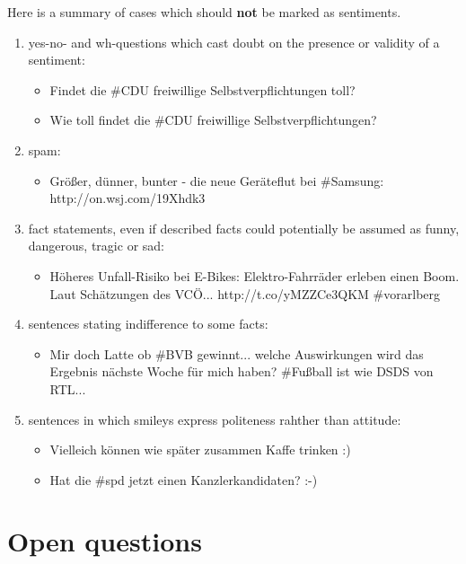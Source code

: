 \documentclass[11pt,a4paper]{article}
\begin{document}
Here is a summary of cases which should \textbf{not} be marked as
sentiments.
\begin{enumerate}
\item \label{no-sent:question} yes-no- and wh-questions which cast doubt on the presence or validity of a sentiment:
  \begin{itemize}
  \item Findet die \#{}CDU freiwillige Selbstverpflichtungen toll?
  \item Wie toll findet die \#{}CDU freiwillige Selbstverpflichtungen?
  \end{itemize}

\item spam:
  \begin{itemize}
  \item Gr\"o\ss{}er, d\"unner, bunter - die neue Ger\"ateflut bei
    \#Samsung: http://on.wsj.com/19Xhdk3
  \end{itemize}

\item fact statements, even if described facts could potentially be
  assumed as funny, dangerous, tragic or sad:
  \begin{itemize}
  \item H\"oheres Unfall-Risiko bei E-Bikes: Elektro-Fahrr\"ader
    erleben einen Boom. Laut Sch\"atzungen des
    VC\"O... http://t.co/yMZZCe3QKM \#{}vorarlberg
  \end{itemize}

\item sentences stating indifference to some facts:
  \begin{itemize}
  \item Mir doch Latte ob \#{}BVB gewinnt... welche Auswirkungen wird
    das Ergebnis n\"achste Woche f\"ur mich haben? \#{}Fu\ss{}ball ist
    wie DSDS von RTL...
  \end{itemize}

\item sentences in which smileys express politeness rahther than attitude:
  \begin{itemize}
  \item Vielleich k\"onnen wie sp\"ater zusammen Kaffe trinken :)
  \item Hat die \#{}spd jetzt einen Kanzlerkandidaten? :-)
  \end{itemize}
\end{enumerate}

\section{Open questions}
\end{document}
